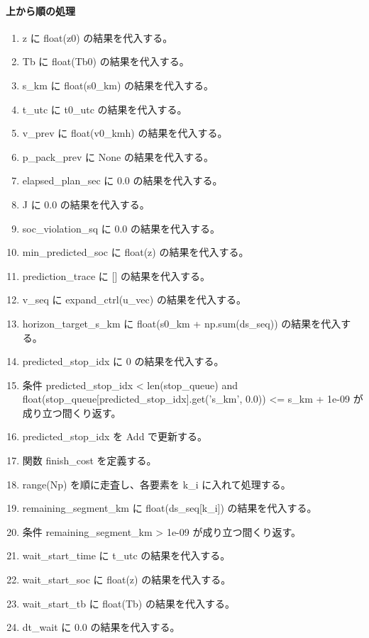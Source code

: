 \documentclass[a4paper,11pt]{article}
\begin{document}
            \paragraph{上から順の処理}
            \begin{enumerate}[leftmargin=1.8em]
            \item z に float(z0) の結果を代入する。
\item Tb に float(Tb0) の結果を代入する。
\item s\_km に float(s0\_km) の結果を代入する。
\item t\_utc に t0\_utc の結果を代入する。
\item v\_prev に float(v0\_kmh) の結果を代入する。
\item p\_pack\_prev に None の結果を代入する。
\item elapsed\_plan\_sec に 0.0 の結果を代入する。
\item J に 0.0 の結果を代入する。
\item soc\_violation\_sq に 0.0 の結果を代入する。
\item min\_predicted\_soc に float(z) の結果を代入する。
\item prediction\_trace に [] の結果を代入する。
\item v\_seq に expand\_ctrl(u\_vec) の結果を代入する。
\item horizon\_target\_s\_km に float(s0\_km + np.sum(ds\_seq)) の結果を代入する。
\item predicted\_stop\_idx に 0 の結果を代入する。
\item 条件 predicted\_stop\_idx < len(stop\_queue) and float(stop\_queue[predicted\_stop\_idx].get('s\_km', 0.0)) <= s\_km + 1e-09 が成り立つ間くり返す。
\item   predicted\_stop\_idx を Add で更新する。
\item 関数 finish\_cost を定義する。
\item range(Np) を順に走査し、各要素を k\_i に入れて処理する。
\item   remaining\_segment\_km に float(ds\_seq[k\_i]) の結果を代入する。
\item   条件 remaining\_segment\_km > 1e-09 が成り立つ間くり返す。
\item     wait\_start\_time に t\_utc の結果を代入する。
\item     wait\_start\_soc に float(z) の結果を代入する。
\item     wait\_start\_tb に float(Tb) の結果を代入する。
\item     dt\_wait に 0.0 の結果を代入する。

\end{enumerate}
\end{document}
